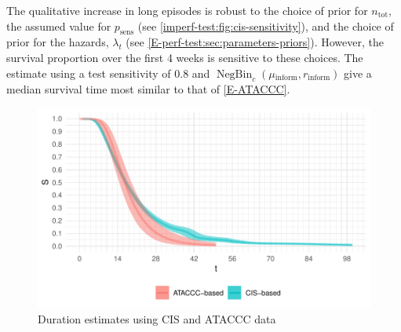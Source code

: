 \documentclass[12pt, letterpaper]{article} %
\DeclareMathOperator{\NBr}{NegBin}
\newcommand{\NBc}{\NBr_{c}}
\newcommand{\psens}{p_\text{sens}}
\newcommand{\ntot}{n_\text{tot}}
\newcommand{\inform}{{_{\text{inform}}}}
\begin{document}
The qualitative increase in long episodes is robust to the choice of prior for $\ntot$, the assumed value for $\psens$ (see \cref{imperf-test:fig:cis-sensitivity}), and the choice of prior for the hazards, $\lambda_t$ (see \cref{E-perf-test:sec:parameters-priors}).
However, the survival proportion over the first 4 weeks is sensitive to these choices.
The estimate using a test sensitivity of 0.8 and $\NBc(\mu\inform, r\inform)$ give a median survival time most similar to that of \cref{E-ATACCC}.
\begin{figure}
  \centering \includegraphics{cis-imperfect-testing/CIS_final}
  \caption{Duration estimates using CIS and ATACCC data}
  \label{imperf-test:fig:cis-estimates}
\end{figure}
\end{document}
